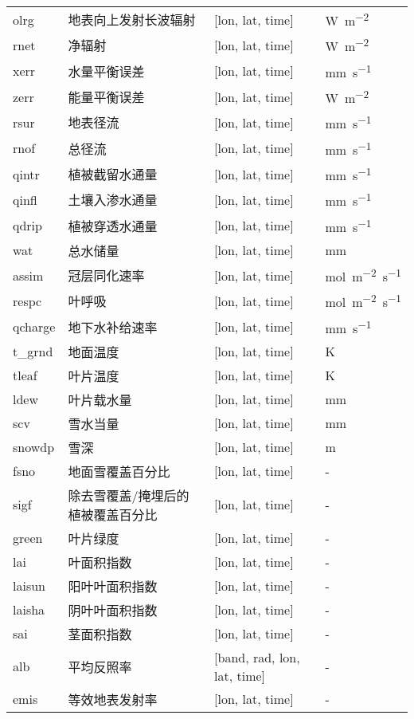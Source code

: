 \documentclass[a4paper,12pt,twoside]{article}
\begin{document}
\begin{longtable}[htbp]{lp{}p{}l}
olrg & 地表向上发射长波辐射 & {[}lon, lat, time{]}  & \unit{W.m^{-2}} \\
rnet & 净辐射 & {[}lon, lat, time{]}  & \unit{W.m^{-2}} \\
xerr & 水量平衡误差 & {[}lon, lat, time{]}  & \unit{mm.s^{-1}} \\
zerr & 能量平衡误差 & {[}lon, lat, time{]}  & \unit{W.m^{-2}} \\
rsur & 地表径流 & {[}lon, lat, time{]}  & \unit{mm.s^{-1}} \\
rnof & 总径流 & {[}lon, lat, time{]}  & \unit{mm.s^{-1}} \\
qintr & 植被截留水通量 & {[}lon, lat, time{]}  & \unit{mm.s^{-1}} \\
qinfl & 土壤入渗水通量 & {[}lon, lat, time{]}  & \unit{mm.s^{-1}} \\
qdrip & 植被穿透水通量 & {[}lon, lat, time{]}  & \unit{mm.s^{-1}} \\
wat & 总水储量 & {[}lon, lat, time{]}  & mm \\
assim & 冠层同化速率 & {[}lon, lat, time{]}  & \unit{mol.m^{-2}.s^{-1}} \\
respc & 叶呼吸 & {[}lon, lat, time{]}  & \unit{mol.m^{-2}.s^{-1}} \\
qcharge & 地下水补给速率 & {[}lon, lat, time{]}  & \unit{mm.s^{-1}} \\
t\_grnd & 地面温度 & {[}lon, lat, time{]}  & K \\
tleaf & 叶片温度 & {[}lon, lat, time{]}  & K \\
ldew & 叶片载水量 & {[}lon, lat, time{]}  & mm \\
scv & 雪水当量 & {[}lon, lat, time{]}  & mm \\
snowdp & 雪深 & {[}lon, lat, time{]}  & m \\
fsno & 地面雪覆盖百分比 & {[}lon, lat, time{]}  & - \\
sigf & 除去雪覆盖/掩埋后的植被覆盖百分比 & {[}lon, lat, time{]}  & - \\
green & 叶片绿度 & {[}lon, lat, time{]}  & - \\
lai & 叶面积指数 & {[}lon, lat, time{]}  & - \\
laisun & 阳叶叶面积指数 & {[}lon, lat, time{]}  & - \\
laisha & 阴叶叶面积指数 & {[}lon, lat, time{]}  & - \\
sai & 茎面积指数 & {[}lon, lat, time{]}  & - \\
alb & 平均反照率 & {[}band, rad, lon, lat, time{]}  & - \\ %
emis & 等效地表发射率 & {[}lon, lat, time{]}  & - \\

\end{longtable}
\end{document}
